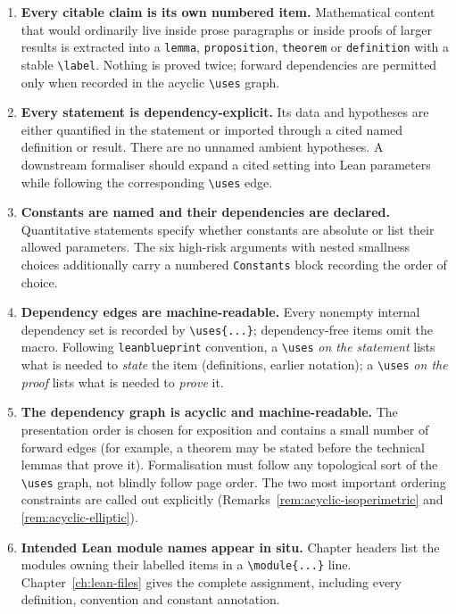 \begin{enumerate}[label=(\arabic*)]
\item \textbf{Every citable claim is its own numbered item.}  Mathematical
  content that would ordinarily live inside prose paragraphs or inside proofs
  of larger results is extracted into a
  \texttt{lemma}, \texttt{proposition}, \texttt{theorem} or
  \texttt{definition} with a stable \verb|\label|.  Nothing is proved twice;
  forward dependencies are permitted only when recorded in the acyclic
  \verb|\uses| graph.
\item \textbf{Every statement is dependency-explicit.}  Its data and
  hypotheses are either quantified in the statement or imported through a
  cited named definition or result.  There are no unnamed ambient hypotheses.
  A downstream formaliser should expand a cited setting into Lean parameters
  while following the corresponding \verb|\uses| edge.
\item \textbf{Constants are named and their dependencies are declared.}
  Quantitative statements specify whether constants are absolute or list
  their allowed parameters.  The six high-risk arguments with nested
  smallness choices additionally carry a numbered \texttt{Constants} block
  recording the order of choice.
\item \textbf{Dependency edges are machine-readable.}  Every nonempty
  internal dependency set is recorded by \verb|\uses{...}|; dependency-free
  items omit the macro.  Following \texttt{leanblueprint} convention, a
  \verb|\uses| \emph{on the statement} lists what is needed to \emph{state}
  the item (definitions, earlier notation); a \verb|\uses| \emph{on the
  proof} lists what is needed to \emph{prove} it.
\item \textbf{The dependency graph is acyclic and machine-readable.}  The
  presentation order is chosen for exposition and contains a small number of
  forward edges (for example, a theorem may be stated before the technical
  lemmas that prove it).  Formalisation must follow any topological sort of
  the \verb|\uses| graph, not blindly follow page order.  The two most
  important ordering constraints are called out explicitly
  (Remarks~\ref{rem:acyclic-isoperimetric} and \ref{rem:acyclic-elliptic}).
\item \textbf{Intended Lean module names appear in situ.}  Chapter headers
  list the modules owning their labelled items in a \verb|\module{...}| line.
  Chapter~\ref{ch:lean-files} gives the complete assignment, including every
  definition, convention and constant annotation.
\end{enumerate}

